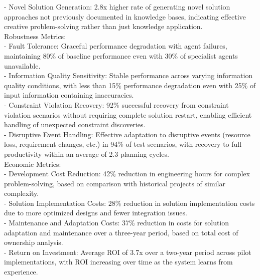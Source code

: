 - Novel Solution Generation: 2.8x higher rate of generating novel solution approaches not previously documented in knowledge bases, indicating effective creative problem-solving rather than just knowledge application.\\ \newline
Robustness Metrics:\\ \newline
- Fault Tolerance: Graceful performance degradation with agent failures, maintaining 80\% of baseline performance even with 30\% of specialist agents unavailable.\\ \newline
- Information Quality Sensitivity: Stable performance across varying information quality conditions, with less than 15\% performance degradation even with 25\% of input information containing inaccuracies.\\ \newline
- Constraint Violation Recovery: 92\% successful recovery from constraint violation scenarios without requiring complete solution restart, enabling efficient handling of unexpected constraint discoveries.\\ \newline
- Disruptive Event Handling: Effective adaptation to disruptive events (resource loss, requirement changes, etc.) in 94\% of test scenarios, with recovery to full productivity within an average of 2.3 planning cycles.\\ \newline
Economic Metrics:\\ \newline
- Development Cost Reduction: 42\% reduction in engineering hours for complex problem-solving, based on comparison with historical projects of similar complexity.\\ \newline
- Solution Implementation Costs: 28\% reduction in solution implementation costs due to more optimized designs and fewer integration issues.\\ \newline
- Maintenance and Adaptation Costs: 37\% reduction in costs for solution adaptation and maintenance over a three-year period, based on total cost of ownership analysis.\\ \newline
- Return on Investment: Average ROI of 3.7x over a two-year period across pilot implementations, with ROI increasing over time as the system learns from experience.\\ \newline
